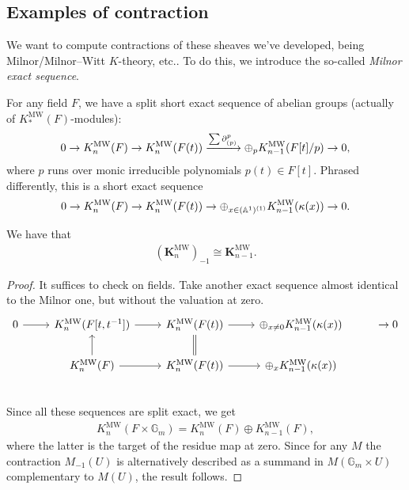 \documentclass[11pt,openany]{book}
\let\del\partial
\providecommand{\MW}{\mathrm{MW}}
\providecommand{\KMW}{\mathbf{K}^\mathrm{MW}}
\begin{document}
\subsection{Examples of contraction}

We want to compute contractions of these sheaves we've developed, being Milnor/Milnor--Witt $K$-theory, etc.. To do this, we introduce the so-called \textit{Milnor exact sequence}.

\begin{theorem} \cite[3.24]{Morel}
For any field $F$, we have a split short exact sequence of abelian groups (actually of $K_\ast^\MW(F)$-modules):
\begin{align*}
    0 \to K_n^\MW(F) \to K_n^\MW(F(t)) \xto{\sum \del^p_{(p)}} \oplus_p K_{n-1}^\MW(F[t]/p) \to 0,
\end{align*}
where $p$ runs over monic irreducible polynomials $p(t) \in F[t]$. Phrased differently, this is a short exact sequence
\begin{align*}
    0 \to K_n^\MW(F) \to K_n^\MW(F(t)) \to \oplus_{x\in(\A^1)^{(1)}} K_{n-1}^\MW(\kappa(x)) \to 0.
\end{align*}
\end{theorem}


\begin{corollary}\label{cor:contraction-MW} 
We have that
\begin{align*}
    \left( \KMW_n \right)_{-1} \cong \KMW_{n-1}.
\end{align*}
\end{corollary}
\begin{proof} It suffices to check on fields. Take another exact sequence almost identical to the Milnor one, but without the valuation at zero.
\[ \begin{tikzcd}
    0\rar & K_n^\MW(F[t,t^{-1}])\rar & K_n^\MW(F(t))\rar & \oplus_{x\ne 0} K_{n-1}^\MW(\kappa(x))&\to 0\\
    & K_n^\MW(F)\uar\rar & K_n^\MW(F(t))\uar[equal]\rar &\oplus_{x} K_{n-1}^\MW(\kappa(x)) \\
\end{tikzcd} \]
Since all these sequences are split exact, we get
\begin{align*}
    K_n^\MW(F \times \mathbb{G}_m) = K_n^\MW(F) \oplus K_{n-1}^\MW(F),
\end{align*}
where the latter is the target of the residue map at zero. Since for any $M$ the contraction $M_{-1}(U)$ is alternatively described as a summand in $M(\mathbb{G}_m \times U)$ complementary to $M(U)$, the result follows.
\end{proof}
\end{document}

